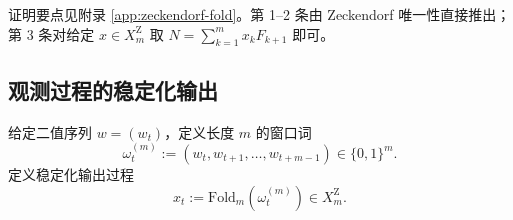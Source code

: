 \begin{remark}
证明要点见附录 \ref{app:zeckendorf-fold}。第 1--2 条由 Zeckendorf 唯一性直接推出；第 3 条对给定 $x\in X_m^{\mathrm Z}$ 取
$N=\sum_{k=1}^m x_k F_{k+1}$ 即可。
\end{remark}

\subsection{观测过程的稳定化输出}

\begin{definition}[滑动窗口稳定化读出]\label{def:sliding-fold}
给定二值序列 $w=(w_t)$，定义长度 $m$ 的窗口词
\[
\omega_t^{(m)}:=(w_t,w_{t+1},\dots,w_{t+m-1})\in\{0,1\}^m.
\]
定义稳定化输出过程
\[
x_t:=\mathrm{Fold}_m(\omega_t^{(m)})\in X_m^{\mathrm Z}.
\]
\end{definition}

